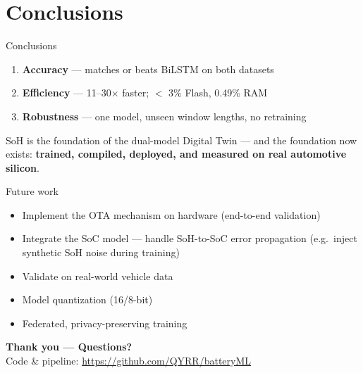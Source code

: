 \documentclass[11pt,aspectratio=169]{beamer}
\begin{document}
\section{Conclusions}

\begin{frame}{Conclusions}
  \begin{enumerate}
    \item \textbf{Accuracy} --- matches or beats BiLSTM on both datasets
    \item \textbf{Efficiency} --- 11--30$\times$ faster; $<$ 3\% Flash, 0.49\% RAM
    \item \textbf{Robustness} --- one model, unseen window lengths, no retraining
  \end{enumerate}
  \vspace{0.5em}
  \begin{block}{}
    SoH is the foundation of the dual-model Digital Twin --- and the foundation
    now exists: \textbf{trained, compiled, deployed, and measured on real
    automotive silicon}.
  \end{block}
\end{frame}

\begin{frame}{Future work}
  \begin{itemize}
    \item Implement the OTA mechanism on hardware (end-to-end validation)
    \item Integrate the SoC model --- handle SoH-to-SoC error propagation
          (e.g.\ inject synthetic SoH noise during training)
    \item Validate on real-world vehicle data
    \item Model quantization (16/8-bit)
    \item Federated, privacy-preserving training
  \end{itemize}
\end{frame}

\begin{frame}[plain]
  \begin{center}
    {\Large\bfseries Thank you --- Questions?}\\[1.2em]
    Code \& pipeline: \url{https://github.com/QYRR/batteryML}
  \end{center}
\end{frame}
\end{document}
